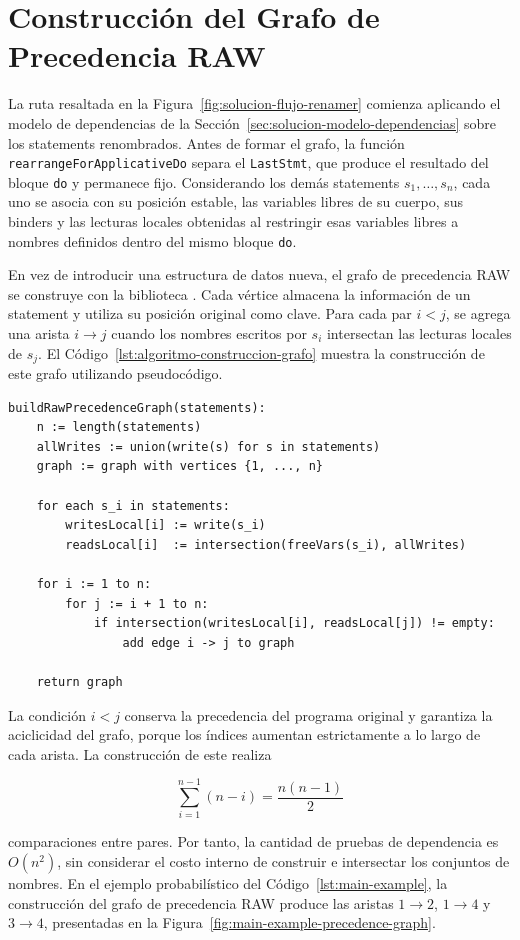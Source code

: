 
\section{Construcción del Grafo de Precedencia RAW}
\label{sec:solucion-implementacion-grafo}

La ruta resaltada en la Figura~\ref{fig:solucion-flujo-renamer} comienza aplicando el modelo de dependencias de la Sección~\ref{sec:solucion-modelo-dependencias} sobre los statements renombrados. Antes de formar el grafo, la función \texttt{rearrangeForApplicativeDo} separa el \texttt{LastStmt}, que produce el resultado del bloque \texttt{do} y permanece fijo. Considerando los demás statements $s_1,\ldots,s_n$, cada uno se asocia con su posición estable, las variables libres de su cuerpo, sus binders y las lecturas locales obtenidas al restringir esas variables libres a nombres definidos dentro del mismo bloque \texttt{do}.

En vez de introducir una estructura de datos nueva, el grafo de precedencia RAW se construye con la biblioteca . Cada vértice almacena la información de un statement y utiliza su posición original como clave. Para cada par $i<j$, se agrega una arista $i\to j$ cuando los nombres escritos por $s_i$ intersectan las lecturas locales de $s_j$. El Código~\ref{lst:algoritmo-construccion-grafo} muestra la construcción de este grafo utilizando pseudocódigo.

\begin{lstlisting}[style=haskell,caption={Pseudocódigo para construir el grafo de precedencia RAW.},label={lst:algoritmo-construccion-grafo}]
buildRawPrecedenceGraph(statements):
    n := length(statements)
    allWrites := union(write(s) for s in statements)
    graph := graph with vertices {1, ..., n}

    for each s_i in statements:
        writesLocal[i] := write(s_i)
        readsLocal[i]  := intersection(freeVars(s_i), allWrites)

    for i := 1 to n:
        for j := i + 1 to n:
            if intersection(writesLocal[i], readsLocal[j]) != empty:
                add edge i -> j to graph

    return graph
\end{lstlisting}

La condición $i<j$ conserva la precedencia del programa original y garantiza la aciclicidad del grafo, porque los índices aumentan estrictamente a lo largo de cada arista. La construcción de este realiza

\[
\sum_{i=1}^{n-1}(n-i)=\frac{n(n-1)}{2}
\]

comparaciones entre pares. Por tanto, la cantidad de pruebas de dependencia es $O(n^2)$, sin considerar el costo interno de construir e intersectar los conjuntos de nombres. En el ejemplo probabilístico del Código~\ref{lst:main-example}, la construcción del grafo de precedencia RAW produce las aristas $1\to2$, $1\to4$ y $3\to4$, presentadas en la Figura~\ref{fig:main-example-precedence-graph}.
